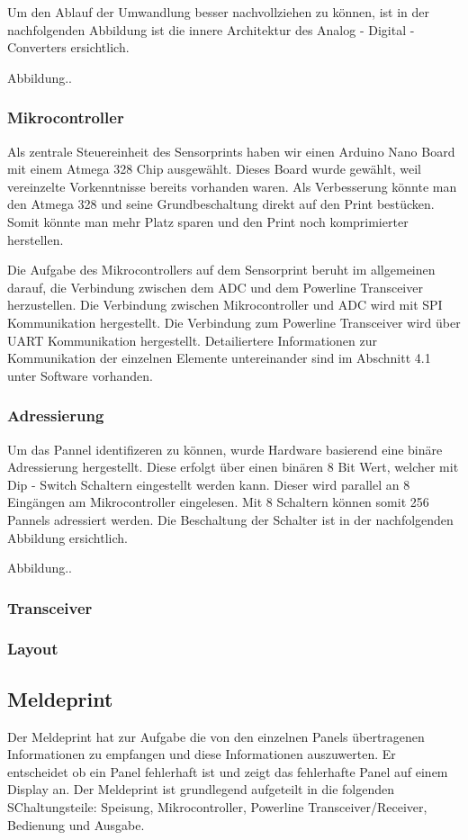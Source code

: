 Um den Ablauf der Umwandlung besser nachvollziehen zu können, ist in der nachfolgenden Abbildung ist die innere Architektur des Analog - Digital - Converters ersichtlich.

Abbildung..

\subsubsection{Mikrocontroller}
Als zentrale Steuereinheit des Sensorprints haben wir einen Arduino Nano Board mit einem Atmega 328 Chip ausgewählt. Dieses Board wurde gewählt, weil vereinzelte Vorkenntnisse bereits vorhanden waren. Als Verbesserung könnte man den Atmega 328 und seine Grundbeschaltung direkt auf den Print bestücken. Somit könnte man mehr Platz sparen und den Print noch komprimierter herstellen.

Die Aufgabe des Mikrocontrollers auf dem Sensorprint beruht im allgemeinen darauf, die Verbindung zwischen dem ADC und dem Powerline Transceiver herzustellen. Die Verbindung zwischen Mikrocontroller und ADC wird mit SPI Kommunikation hergestellt. Die Verbindung zum Powerline Transceiver wird über UART Kommunikation hergestellt. Detailiertere Informationen zur Kommunikation der einzelnen Elemente untereinander sind im Abschnitt 4.1 unter Software vorhanden.

\subsubsection{Adressierung}
Um das Pannel identifizeren zu können, wurde Hardware basierend eine binäre Adressierung hergestellt. Diese erfolgt über einen binären 8 Bit Wert, welcher mit Dip - Switch Schaltern eingestellt werden kann. Dieser wird parallel an 8 Eingängen am Mikrocontroller eingelesen. Mit 8 Schaltern können somit 256 Pannels adressiert werden. Die Beschaltung der Schalter ist in der nachfolgenden Abbildung ersichtlich.

Abbildung..

\subsubsection{Transceiver}
\subsubsection{Layout}

\subsection{Meldeprint}
Der Meldeprint hat zur Aufgabe die von den einzelnen Panels übertragenen Informationen zu empfangen und diese Informationen auszuwerten. Er entscheidet ob ein Panel fehlerhaft ist und zeigt das fehlerhafte Panel auf einem Display an. Der Meldeprint ist grundlegend aufgeteilt in die folgenden SChaltungsteile: Speisung, Mikrocontroller, Powerline Transceiver/Receiver, Bedienung und Ausgabe.

